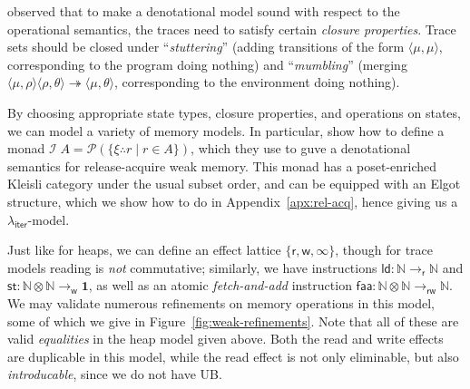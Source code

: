 \documentclass[acmsmall,screen,review]{acmart}
\newcommand{\mc}[1]{\ensuremath{\mathcal{#1}}}
\newcommand{\mb}[1]{\ensuremath{\mathbf{#1}}}
\newcommand{\ms}[1]{\ensuremath{\mathsf{#1}}}
\newcommand{\nats}{\mathbb{N}}
\newcommand{\tref}{\twoheadrightarrow}
\newcommand{\subiterexp}{\texorpdfstring{\(\lambda_{\ms{iter}}\)}{lambda-iter}}
\newcommand{\tret}[2]{#1 \therefore #2}
\begin{document}
\citet{brookes-full-abstraction-96} observed that to make a denotational model sound with respect to
the operational semantics, the traces need to satisfy certain \emph{closure properties}. Trace sets
should be closed under ``\emph{stuttering}'' (adding transitions of the form $\langle \mu, \mu
\rangle$, corresponding to the program doing nothing) and ``\emph{mumbling}'' (merging $\langle \mu,
\rho \rangle\langle \rho, \theta \rangle \tref \langle \mu, \theta \rangle$, corresponding to the
environment doing nothing).

By choosing appropriate state types, closure properties, and operations on states, we can model a
variety of memory models. In particular,
\citet{release-acquire} show how to define a monad $\mc{I}\;A = \mc{P}(\{\tret{\xi}{r} \mid r \in
A\})$, which they use to guve a denotational semantics for release-acquire weak memory. This monad
has a poset-enriched Kleisli category under the usual subset order, and can be equipped with an
Elgot structure, which we show how to do in
Appendix~\ref{apx:rel-acq}, hence giving us a \subiterexp{}-model.

Just like for heaps, we can define an effect lattice $\{\ms{r}, \ms{w}, \infty\}$, though
for trace models reading is \emph{not} commutative; similarly, we have instructions $\ms{ld}: \nats
\to_{\ms{r}} \nats$ and $\ms{st}: \nats \otimes \nats \to_{\ms{w}} \mb{1}$, as well as an atomic
\emph{fetch-and-add} instruction $\ms{faa}: \nats \otimes \nats \to_{\ms{rw}} \nats$. We may
validate numerous refinements on memory operations in this model, some of which we give in
Figure~\ref{fig:weak-refinements}. Note that all of these are valid \emph{equalities} in the heap
model given above. Both the read and write effects are duplicable in this model, while the read
effect is not only eliminable, but also \emph{introducable}, since we do not have UB.
\end{document}
